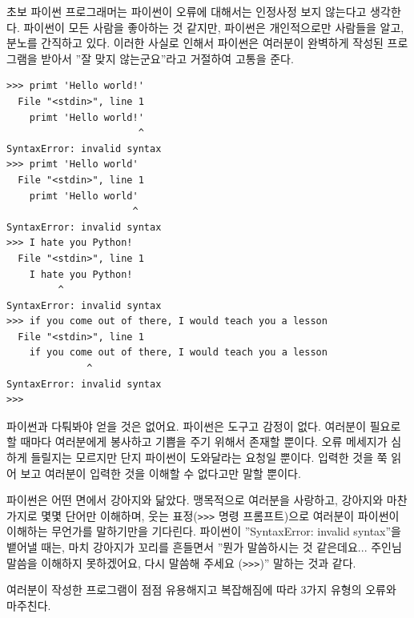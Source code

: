 초보 파이썬 프로그래머는 파이썬이 오류에 대해서는 인정사정 보지 않는다고 생각한다. 
파이썬이 모든 사람을 좋아하는 것 같지만, 파이썬은 개인적으로만 사람들을 알고, 분노를 간직하고 있다. 
이러한 사실로 인해서 파이썬은 여러분이 완벽하게 작성된 프로그램을 받아서 ''잘 맞지 않는군요''라고 거절하여 고통을 준다.

\beforeverb
\begin{verbatim}
>>> primt 'Hello world!'
  File "<stdin>", line 1
    primt 'Hello world!'
                       ^
SyntaxError: invalid syntax
>>> primt 'Hello world'
  File "<stdin>", line 1
    primt 'Hello world'
                      ^
SyntaxError: invalid syntax
>>> I hate you Python!
  File "<stdin>", line 1
    I hate you Python!
         ^
SyntaxError: invalid syntax
>>> if you come out of there, I would teach you a lesson
  File "<stdin>", line 1
    if you come out of there, I would teach you a lesson
              ^
SyntaxError: invalid syntax
>>> 
\end{verbatim}
\afterverb
%

파이썬과 다퉈봐야 얻을 것은 없어요. 
파이썬은 도구고 감정이 없다. 
여러분이 필요로 할 때마다 여러분에게 봉사하고 기쁨을 주기 위해서 존재할 뿐이다. 
오류 메세지가 심하게 들릴지는 모르지만 단지 파이썬이 도와달라는 요청일 뿐이다. 
입력한 것을 쭉 읽어 보고 여러분이 입력한 것을 이해할 수 없다고만 말할 뿐이다.

파이썬은 어떤 면에서 강아지와 닮았다. 
맹목적으로 여러분을 사랑하고, 강아지와 마찬가지로 몇몇 단어만 이해하며,
웃는 표정({\tt >>>} 명령 프롬프트)으로 여러분이 파이썬이 이해하는 무언가를 말하기만을 기다린다. 
파이썬이 ''SyntaxError: invalid syntax''을 뱉어낼 때는, 
마치 강아지가 꼬리를 흔들면서 ''뭔가 말씀하시는 것 같은데요... 주인님 말씀을 이해하지 못하겠어요, 다시 말씀해 주세요 ({\tt >>>})'' 말하는 것과 같다.

여러분이 작성한 프로그램이 점점 유용해지고 복잡해짐에 따라 3가지 유형의 오류와 마주친다.

